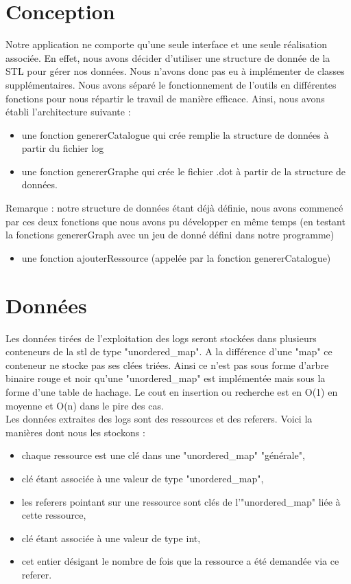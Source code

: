 \documentclass[a4paper]{article}
\begin{document}
\section{Conception}\noindent

	Notre application ne comporte qu'une seule interface et une seule réalisation associée. En effet, nous avons décider d'utiliser une structure de donnée de la STL pour gérer nos données. Nous n'avons donc pas eu à implémenter de classes supplémentaires. Nous avons séparé le fonctionnement de l'outils en différentes fonctions pour nous répartir le travail de manière efficace. Ainsi, nous avons établi l'architecture suivante :
	\begin{itemize}
		\item une fonction genererCatalogue qui crée remplie la structure de données à partir du fichier log
		\item une fonction genererGraphe qui crée le fichier .dot à partir de la structure de données. 
		\end{itemize}
		
	Remarque : notre structure de données étant déjà définie, nous avons commencé par ces deux fonctions que nous avons pu développer en même temps (en testant la fonctions genererGraph avec un jeu de donné défini dans notre programme)
	
	\begin{itemize}
	\item une fonction ajouterRessource (appelée par la fonction genererCatalogue) 
	\end{itemize}

\newpage
\section{Données}\noindent

Les données tirées de l'exploitation des logs seront stockées dans plusieurs conteneurs de la stl de type "unordered\_map". A la différence d'une "map" ce conteneur ne stocke pas ses clées triées. Ainsi ce n'est pas sous forme d'arbre binaire rouge et noir qu'une "unordered\_map" est implémentée mais sous la forme d'une table de hachage. Le cout en insertion ou recherche est en O(1) en moyenne et O(n) dans le pire des cas. 
\\
Les données extraites des logs sont des ressources et des referers. Voici la manières dont nous les stockons :
\begin{itemize}
\item chaque ressource est une clé dans une "unordered\_map" "générale",
\item clé étant associée à une valeur de type "unordered\_map",
\item les referers pointant sur une ressource sont clés de l'"unordered\_map" liée à cette ressource,
\item clé étant associée à une valeur de type int,
\item cet entier désigant le nombre de fois que la ressource a été demandée via ce referer.
\end{itemize}
\vspace*{\fill}
\end{document}
